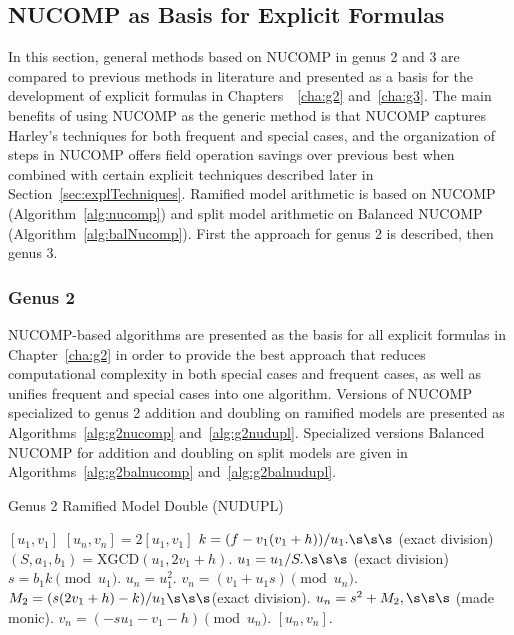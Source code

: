 \subsection{NUCOMP as Basis for Explicit Formulas}\label{sec:nucompbasis}
\label{sec:comparisons}
In this section, general methods based on NUCOMP in genus 2 and 3 are compared
to previous methods in literature and presented as a basis for the development
of explicit formulas in Chapters~~\ref{cha:g2} and~\ref{cha:g3}. The main
benefits of using NUCOMP as the generic method is that NUCOMP captures Harley's
techniques for both frequent and special cases, and the organization of steps in
NUCOMP offers field operation savings over previous best when combined with
certain explicit techniques described later in Section~\ref{sec:explTechniques}.
Ramified model arithmetic is based on NUCOMP (Algorithm~\ref{alg:nucomp}) and
split model arithmetic on Balanced NUCOMP (Algorithm~\ref{alg:balNucomp}). First
the approach for genus 2 is described, then genus 3.


\subsubsection{Genus 2}
NUCOMP-based algorithms are presented as the basis for all explicit formulas in
Chapter~\ref{cha:g2} in order to provide the best approach that reduces
computational complexity in both special cases and frequent cases, as well as
unifies frequent and special cases into one algorithm. Versions of NUCOMP
specialized to genus 2 addition and doubling on ramified models are presented as
Algorithms~\ref{alg:g2nucomp} and~\ref{alg:g2nudupl}. Specialized versions
Balanced NUCOMP for addition and doubling on split models are given in
Algorithms~\ref{alg:g2balnucomp} and~\ref{alg:g2balnudupl}. 



\begin{algorithm}[htbp]
    \caption{Genus 2 Ramified Model Double (NUDUPL)}
    \label{alg:g2nudupl}
    \begin{algorithmic}[1]
    \Require $[u_1,v_1]$
    \Ensure $[u_n,v_n] = 2[u_1,v_1]$
    \State $k = (f - v_1(v_1 + h))/u_1. \s\s\s$ (exact division)
    \State $(S,a_1,b_1) = \mathrm{XGCD}(u_1,2v_1 + h)$.
        \State $u_1 = u_1/S. \s\s\s$ (exact division)
    \EndIf
    \State $s = b_1k \pmod{u_1}$.
        \State $u_n = u_1^2$.
        \State $v_n = (v_1 + u_1s) \pmod{u_n}$.
    \Else
        \State $M_2 = (s(2v_1 + h) - k)/u_1 \s\s\s $(exact division).
        \State $u_n = s^2 + M_2, \s\s\s $ (made monic).
        \State $v_n = (-su_1 - v_1 - h) \pmod{u_n}$.
    \EndIf
    \State \Return $[u_n,v_n]$.
    \end{algorithmic}
    \end{algorithm}

